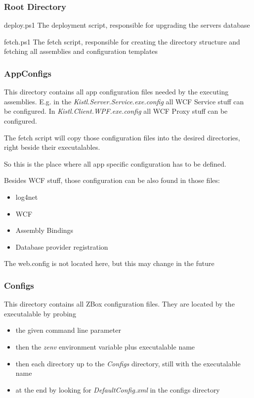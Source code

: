 \subsubsection{Root Directory}
\begin{descriptionBorder}
\item[deploy.ps1] The deployment script, responsible for upgrading the servers
database

\item[fetch.ps1] The fetch script, responsible for creating the directory
structure and fetching all assemblies and configuration templates
\end{descriptionBorder}

\subsubsection{AppConfigs}
This directory contains all app configuration files needed by the executing
assemblies. E.g. in the \emph{Kistl.Server.Service.exe.config} all WCF Service
stuff can be configured. In \emph{Kistl.Client.WPF.exe.config} all WCF Proxy
stuff can be configured.

The fetch script will copy those configuration files into the desired
directories, right beside their executalables.

So this is the place where all app specific configuration has to be defined.

Besides WCF stuff, those configuration can be also found in those files:

\begin{itemize}
  \item log4net
  \item WCF
  \item Assembly Bindings
  \item Database provider registration 
\end{itemize} 

\begin{note}
The web.config is not located here, but this may change in the
future
\end{note}

\subsubsection{Configs}
This directory contains all ZBox configuration files. They are located by the
executalable by probing 
\begin{itemize}
  \item the given command line parameter
  \item then the \emph{zenv} environment variable plus executalable name
  \item then each directory up to the \emph{Configs} directory, still with the
  executalable name
  \item at the end by looking for \emph{DefaultConfig.xml} in the configs
  directory
\end{itemize}

